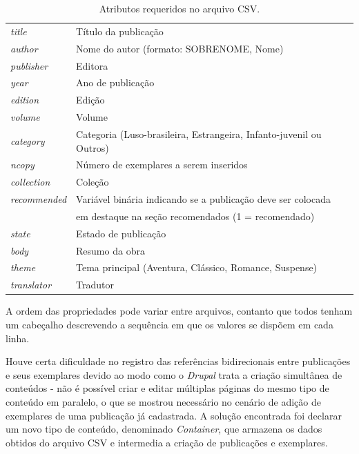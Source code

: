 \documentclass[a4paper]{article}
\begin{document}
\begin{table}[hc]
\centering
\caption{Atributos requeridos no arquivo CSV.\label{csv}}
\begin{tabular}{ll}
\hline
\textit{title} & Título da publicação \\
\textit{author} & Nome do autor (formato: SOBRENOME, Nome) \\
\textit{publisher} & Editora \\
\textit{year} & Ano de publicação \\
\textit{edition} & Edição \\
\textit{volume} & Volume \\
\textit{category} & Categoria (Luso-brasileira, Estrangeira, Infanto-juvenil ou Outros) \\
\textit{ncopy} & Número de exemplares a serem inseridos \\
\textit{collection} & Coleção \\
\textit{recommended} & Variável binária indicando se a publicação deve ser colocada \\
 & em destaque na seção recomendados (1 = recomendado) \\
\textit{state} & Estado de publicação \\
\textit{body} & Resumo da obra \\
\textit{theme} & Tema principal (Aventura, Clássico, Romance, Suspense) \\
\textit{translator} & Tradutor \\
\hline
\end{tabular}
\end{table}

A ordem das propriedades pode variar entre arquivos, contanto que todos tenham um cabeçalho descrevendo a sequência em que os valores se dispõem em cada linha.

Houve certa dificuldade no registro das referências bidirecionais entre publicações e seus exemplares devido ao modo como o \textit{Drupal} trata a criação simultânea de  conteúdos - não é possível criar e editar múltiplas páginas do mesmo tipo de conteúdo em paralelo, o que se mostrou necessário no cenário de adição de exemplares de uma publicação já cadastrada. A solução encontrada foi declarar um novo tipo de conteúdo, denominado \textit{Container}, que armazena os dados obtidos do arquivo CSV e intermedia a criação de publicações e exemplares.
\end{document}
